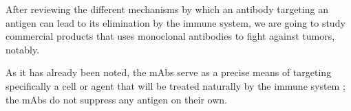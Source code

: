 After reviewing the different mechanisms by which an antibody targeting
an antigen can lead to its elimination by the immune system, we are going
to study commercial products that uses monoclonal antibodies to fight
against tumors, notably.

As it has already been noted, the mAbs serve as a precise means of targeting
specifically a cell or agent that will be treated naturally by the immune system ; 
the mAbs do not suppress any antigen on their own.

